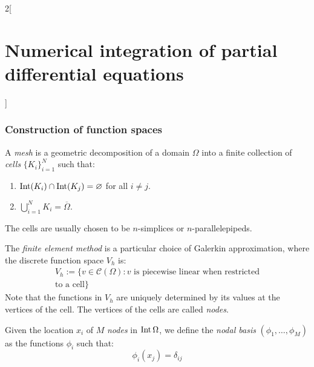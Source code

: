 \documentclass[../../../main_math.tex]{subfiles}
\begin{document}
\begin{multicols}{2}[\section{Numerical integration of partial differential equations}]
  \subsubsection{Construction of function spaces}
  \begin{definition}[Mesh]
    A \emph{mesh} is a geometric decomposition of a domain $\Omega$ into a finite collection of \emph{cells} ${\{K_i\}}_{i=1}^N$ such that:
    \begin{enumerate}
      \item $\operatorname{Int}(K_i) \cap \operatorname{Int}(K_j) = \varnothing$ for all $i\neq j$.
      \item $\bigcup_{i=1}^N K_i = \overline{\Omega}$.
    \end{enumerate}
    The cells are usually chosen to be $n$-simplices or $n$-parallelepipeds.
  \end{definition}
  \begin{definition}
    The \emph{finite element method} is a particular choice of Galerkin approximation, where the discrete function space
    $V_h$ is:
    \begin{multline*}
      V_h:=\{v\in\mathcal{C}(\Omega):v\text{ is piecewise linear when restricted}\\\text{to a cell}\}
    \end{multline*}
    Note that the functions in $V_h$ are uniquely determined by its values at the vertices of the cell. The vertices of the cells are called \emph{nodes}.
  \end{definition}
  \begin{definition}
    Given the location $x_i$ of $M$ \emph{nodes} in $\operatorname{Int}\Omega$, we define the \emph{nodal basis} $(\phi_1,\ldots,\phi_M)$ as the functions $\phi_i$ such that:
    $$\phi_i(x_j)=\delta_{ij}$$
  \end{definition}

\end{multicols}
\end{document}

